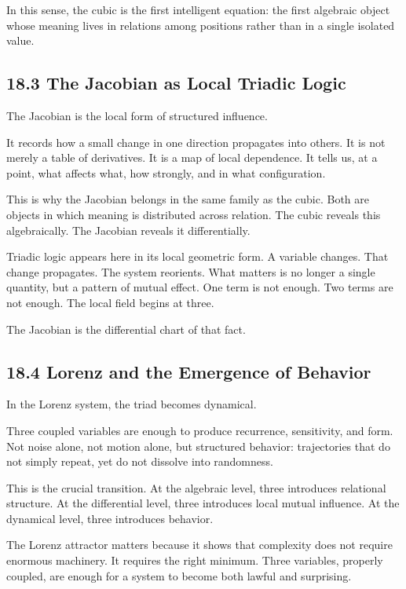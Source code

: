 In this sense, the cubic is the first intelligent equation: the first
algebraic object whose meaning lives in relations among positions rather
than in a single isolated value.

\hypertarget{the-jacobian-as-local-triadic-logic}{%
\subsection{18.3 The Jacobian as Local Triadic
Logic}\label{the-jacobian-as-local-triadic-logic}}

The Jacobian is the local form of structured influence.

It records how a small change in one direction propagates into others.
It is not merely a table of derivatives. It is a map of local
dependence. It tells us, at a point, what affects what, how strongly,
and in what configuration.

This is why the Jacobian belongs in the same family as the cubic. Both
are objects in which meaning is distributed across relation. The cubic
reveals this algebraically. The Jacobian reveals it differentially.

Triadic logic appears here in its local geometric form. A variable
changes. That change propagates. The system reorients. What matters is
no longer a single quantity, but a pattern of mutual effect. One term is
not enough. Two terms are not enough. The local field begins at three.

The Jacobian is the differential chart of that fact.

\hypertarget{lorenz-and-the-emergence-of-behavior}{%
\subsection{18.4 Lorenz and the Emergence of
Behavior}\label{lorenz-and-the-emergence-of-behavior}}

In the Lorenz system, the triad becomes dynamical.

Three coupled variables are enough to produce recurrence, sensitivity,
and form. Not noise alone, not motion alone, but structured behavior:
trajectories that do not simply repeat, yet do not dissolve into
randomness.

This is the crucial transition. At the algebraic level, three introduces
relational structure. At the differential level, three introduces local
mutual influence. At the dynamical level, three introduces behavior.

The Lorenz attractor matters because it shows that complexity does not
require enormous machinery. It requires the right minimum. Three
variables, properly coupled, are enough for a system to become both
lawful and surprising.

